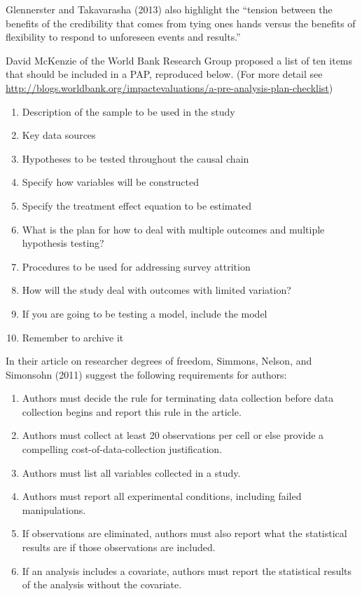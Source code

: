 \documentclass[12pt] {article}
\begin{document}
Glennerster and Takavarasha (2013) also highlight the ``tension between
the benefits of the credibility that comes from tying ones hands versus
the benefits of flexibility to respond to unforeseen events and
results.''

David McKenzie of the World Bank Research Group proposed a list of ten
items that should be included in a PAP, reproduced below. (For more
detail see
\url{http://blogs.worldbank.org/impactevaluations/a-pre-analysis-plan-checklist})

\begin{enumerate}
\def\labelenumi{\arabic{enumi}.}
\item
  Description of the sample to be used in the study
\item
  Key data sources
\item
  Hypotheses to be tested throughout the causal chain
\item
  Specify how variables will be constructed
\item
  Specify the treatment effect equation to be estimated
\item
  What is the plan for how to deal with multiple outcomes and multiple
  hypothesis testing?
\item
  Procedures to be used for addressing survey attrition
\item
  How will the study deal with outcomes with limited variation?
\item
  If you are going to be testing a model, include the model
\item
  Remember to archive it
\end{enumerate}

In their article on researcher degrees of freedom, Simmons, Nelson, and
Simonsohn (2011) suggest the following requirements for authors:

\begin{enumerate}
\def\labelenumi{\arabic{enumi}.}
\item
  Authors must decide the rule for terminating data collection before
  data collection begins and report this rule in the article.
\item
  Authors must collect at least 20 observations per cell or else provide
  a compelling cost-of-data-collection justification.
\item
  Authors must list all variables collected in a study.
\item
  Authors must report all experimental conditions, including failed
  manipulations.
\item
  If observations are eliminated, authors must also report what the
  statistical results are if those observations are included.
\item
  If an analysis includes a covariate, authors must report the
  statistical results of the analysis without the covariate.
\end{enumerate}
\end{document}
